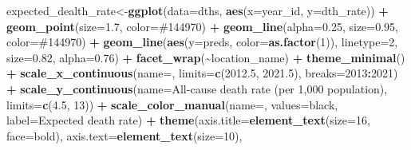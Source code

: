 \documentclass[
]{article}
\newenvironment{Shaded}{\begin{snugshade}}{\end{snugshade}}
\newcommand{\AttributeTok}[1]{\textcolor[rgb]{0.13,0.29,0.53}{#1}}
\newcommand{\DecValTok}[1]{\textcolor[rgb]{0.00,0.00,0.81}{#1}}
\newcommand{\FloatTok}[1]{\textcolor[rgb]{0.00,0.00,0.81}{#1}}
\newcommand{\FunctionTok}[1]{\textcolor[rgb]{0.13,0.29,0.53}{\textbf{#1}}}
\newcommand{\NormalTok}[1]{#1}
\newcommand{\OtherTok}[1]{\textcolor[rgb]{0.56,0.35,0.01}{#1}}
\newcommand{\SpecialCharTok}[1]{\textcolor[rgb]{0.81,0.36,0.00}{\textbf{#1}}}
\newcommand{\StringTok}[1]{\textcolor[rgb]{0.31,0.60,0.02}{#1}}
\begin{document}
\begin{Shaded}
\begin{Highlighting}[]
\NormalTok{expected\_dealth\_rate}\OtherTok{\textless{}{-}}\FunctionTok{ggplot}\NormalTok{(}\AttributeTok{data=}\NormalTok{dths, }\FunctionTok{aes}\NormalTok{(}\AttributeTok{x=}\NormalTok{year\_id, }\AttributeTok{y=}\NormalTok{dth\_rate)) }\SpecialCharTok{+}
  \FunctionTok{geom\_point}\NormalTok{(}\AttributeTok{size=}\FloatTok{1.7}\NormalTok{, }\AttributeTok{color=}\StringTok{\textquotesingle{}\#144970\textquotesingle{}}\NormalTok{) }\SpecialCharTok{+}
  \FunctionTok{geom\_line}\NormalTok{(}\AttributeTok{alpha=}\FloatTok{0.25}\NormalTok{, }\AttributeTok{size=}\FloatTok{0.95}\NormalTok{, }\AttributeTok{color=}\StringTok{\textquotesingle{}\#144970\textquotesingle{}}\NormalTok{) }\SpecialCharTok{+}
  \FunctionTok{geom\_line}\NormalTok{(}\FunctionTok{aes}\NormalTok{(}\AttributeTok{y=}\NormalTok{preds, }\AttributeTok{color=}\FunctionTok{as.factor}\NormalTok{(}\DecValTok{1}\NormalTok{)), }\AttributeTok{linetype=}\DecValTok{2}\NormalTok{, }\AttributeTok{size=}\FloatTok{0.82}\NormalTok{, }\AttributeTok{alpha=}\FloatTok{0.76}\NormalTok{) }\SpecialCharTok{+}
  \FunctionTok{facet\_wrap}\NormalTok{(}\SpecialCharTok{\textasciitilde{}}\NormalTok{location\_name) }\SpecialCharTok{+} \FunctionTok{theme\_minimal}\NormalTok{() }\SpecialCharTok{+}
  \FunctionTok{scale\_x\_continuous}\NormalTok{(}\AttributeTok{name=}\StringTok{\textquotesingle{}\textquotesingle{}}\NormalTok{, }\AttributeTok{limits=}\FunctionTok{c}\NormalTok{(}\FloatTok{2012.5}\NormalTok{, }\FloatTok{2021.5}\NormalTok{), }\AttributeTok{breaks=}\DecValTok{2013}\SpecialCharTok{:}\DecValTok{2021}\NormalTok{) }\SpecialCharTok{+}
  \FunctionTok{scale\_y\_continuous}\NormalTok{(}\AttributeTok{name=}\StringTok{\textquotesingle{}All{-}cause death rate (per 1,000 population)\textquotesingle{}}\NormalTok{, }\AttributeTok{limits=}\FunctionTok{c}\NormalTok{(}\FloatTok{4.5}\NormalTok{, }\DecValTok{13}\NormalTok{)) }\SpecialCharTok{+}
  \FunctionTok{scale\_color\_manual}\NormalTok{(}\AttributeTok{name=}\StringTok{\textquotesingle{}\textquotesingle{}}\NormalTok{, }\AttributeTok{values=}\StringTok{\textquotesingle{}black\textquotesingle{}}\NormalTok{, }\AttributeTok{label=}\StringTok{\textquotesingle{}Expected death rate\textquotesingle{}}\NormalTok{) }\SpecialCharTok{+}
  \FunctionTok{theme}\NormalTok{(}\AttributeTok{axis.title=}\FunctionTok{element\_text}\NormalTok{(}\AttributeTok{size=}\DecValTok{16}\NormalTok{, }\AttributeTok{face=}\StringTok{\textquotesingle{}bold\textquotesingle{}}\NormalTok{), }\AttributeTok{axis.text=}\FunctionTok{element\_text}\NormalTok{(}\AttributeTok{size=}\DecValTok{10}\NormalTok{),}

\end{Highlighting}
\end{Shaded}
\end{document}
